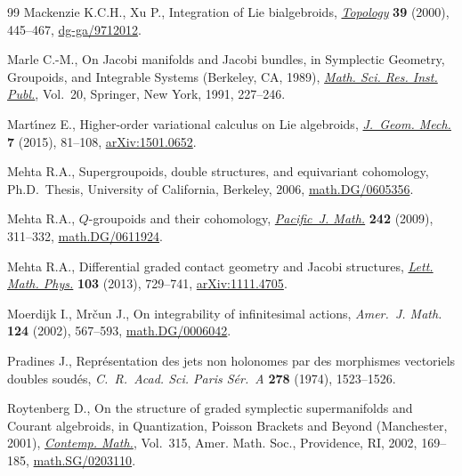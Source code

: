 \documentclass[10pt,a4paper]{amsart}
\numberwithin{equation}{section}
\begin{document}
\begin{thebibliography}{99}
Mackenzie K.C.H., Xu P., Integration of {L}ie bialgebroids, \href{http://dx.doi.org/10.1016/S0040-9383(98)00069-X}{\textit{Topology}}
  \textbf{39} (2000), 445--467, \href{http://arxiv.org/abs/dg-ga/9712012}{dg-ga/9712012}.

Marle C.-M., On {J}acobi manifolds and {J}acobi bundles, in Symplectic Geometry,
  Groupoids, and Integrable Systems ({B}erkeley, {CA}, 1989), \href{http://dx.doi.org/10.1007/978-1-4613-9719-9_16}{\textit{Math.
  Sci. Res. Inst. Publ.}}, Vol.~20, Springer, New York, 1991, 227--246.

Mart{\'{\i}}nez E., Higher-order variational calculus on {L}ie algebroids,
  \href{http://dx.doi.org/10.3934/jgm.2015.7.81}{\textit{J.~Geom. Mech.}} \textbf{7} (2015), 81--108, \href{http://arxiv.org/abs/1501.0652}{arXiv:1501.0652}.

Mehta R.A., Supergroupoids, double structures, and equivariant cohomology,
  Ph.D.~Thesis, University of California, Berkeley, 2006,
  \href{http://arxiv.org/abs/math.DG/0605356}{math.DG/0605356}.

Mehta R.A., {$Q$}-groupoids and their cohomology, \href{http://dx.doi.org/10.2140/pjm.2009.242.311}{\textit{Pacific~J. Math.}}
  \textbf{242} (2009), 311--332, \href{http://arxiv.org/abs/math.DG/0611924}{math.DG/0611924}.

Mehta R.A., Dif\/ferential graded contact geometry and {J}acobi structures,
  \href{http://dx.doi.org/10.1007/s11005-013-0609-6}{\textit{Lett. Math. Phys.}} \textbf{103} (2013), 729--741, \href{http://arxiv.org/abs/1111.4705}{arXiv:1111.4705}.

Moerdijk I., Mr{\v{c}}un J., On integrability of inf\/initesimal actions,
  \textit{Amer.~J. Math.} \textbf{124} (2002), 567--593,
  \href{http://arxiv.org/abs/math.DG/0006042}{math.DG/0006042}.

Pradines J., Repr\'esentation des jets non holonomes par des morphismes
  vectoriels doubles soud\'es, \textit{C.~R.~Acad. Sci. Paris S\'er.~A}
  \textbf{278} (1974), 1523--1526.

Roytenberg D., On the structure of graded symplectic supermanifolds and
  {C}ourant algebroids, in Quantization, {P}oisson Brackets and Beyond
  ({M}anchester, 2001), \href{http://dx.doi.org/10.1090/conm/315/05479}{\textit{Contemp. Math.}}, Vol.~315, Amer. Math. Soc.,
  Providence, RI, 2002, 169--185, \href{http://arxiv.org/abs/math.SG/0203110}{math.SG/0203110}.


\end{thebibliography}
\end{document}

